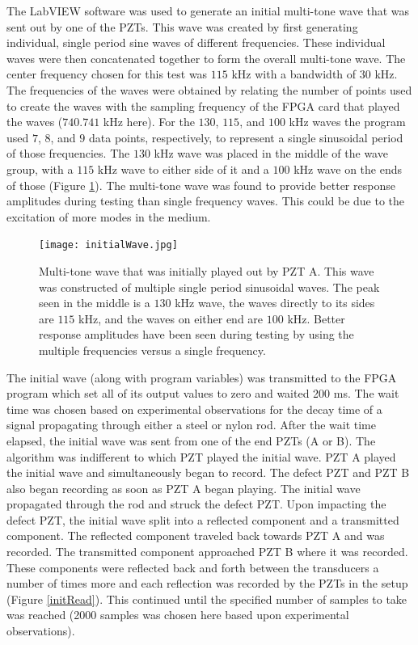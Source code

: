 \documentclass[11pt,letterpaper]{article}%
\begin{document}
The LabVIEW software was used to generate an initial multi-tone wave that was sent out by one of the PZTs. This wave was created by first generating individual, single period sine waves of different frequencies. These individual waves were then concatenated together to form the overall multi-tone wave. The center frequency chosen for this test was $115$ kHz with a bandwidth of $30$ kHz. The frequencies of the waves were obtained by relating the number of points used to create the waves with the sampling frequency of the FPGA card that played the waves ($740.741$ kHz here). For the $130$, $115$, and $100$ kHz waves the program used $7$, $8$, and $9$ data points, respectively, to represent a single sinusoidal period of those frequencies. The $130$ kHz wave was placed in the middle of the wave group, with a $115$ kHz wave to either side of it and a $100$ kHz wave on the ends of those (Figure \ref{initialWave}). The multi-tone wave was found to provide better response amplitudes during testing than single frequency waves. This could be due to the excitation of more modes in the medium.

\begin{figure}
\begin{center}
{\texttt{[image: initialWave.jpg]}}
 \caption[comp1]
   { \label{initialWave}
   Multi-tone wave that was initially played out by PZT A. This wave was constructed of multiple single period sinusoidal waves. The peak seen in the middle is a $130$ kHz wave, the waves directly to its sides are $115$ kHz, and the waves on either end are $100$ kHz. Better response amplitudes have been seen during testing by using the multiple frequencies versus a single frequency.
 }
 \end{center}
 \end{figure}

The initial wave (along with program variables) was transmitted to the FPGA program which set all of its output values to zero and waited 200 ms. The wait time was chosen based on experimental observations for the decay time of a signal propagating through either a steel or nylon rod. After the wait time elapsed, the initial wave was sent from one of the end PZTs (A or B). The algorithm was indifferent to which PZT played the initial wave. PZT A played the initial wave and simultaneously began to record. The defect PZT and PZT B also began recording as soon as PZT A began playing. The initial wave propagated through the rod and struck the defect PZT. Upon impacting the defect PZT, the initial wave split into a reflected component and a transmitted component. The reflected component traveled back towards PZT A and was recorded. The transmitted component approached PZT B where it was recorded. These components were reflected back and forth between the transducers a number of times more and each reflection was recorded by the PZTs in the setup (Figure \ref{initRead}). This continued until the specified number of samples to take was reached (2000 samples was chosen here based upon experimental observations).
\end{document}
